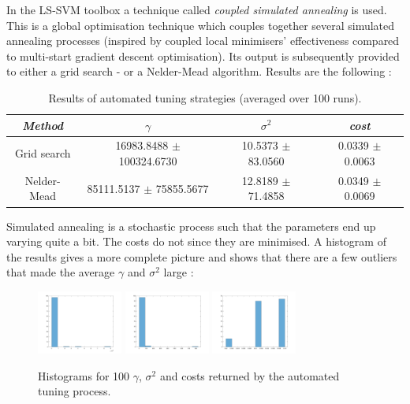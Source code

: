 \par In the LS-SVM toolbox a technique called \textit{coupled simulated annealing} is used. This is a global optimisation technique which couples together several simulated annealing processes (inspired by coupled local minimisers' effectiveness compared to multi-start gradient descent optimisation). Its output is subsequently provided to either a grid search - or a Nelder-Mead algorithm. Results are the following :

\begin{table}[h]
\centering
\begin{tabular}{c|ccc}
\textit{Method} & $\gamma$ & $\sigma^2$ & \textit{cost} \\
\hline
Grid search & 16983.8488 $\pm$ 100324.6730 & 10.5373 $\pm$ 83.0560 & 0.0339 $\pm$ 0.0063\\
Nelder-Mead & 85111.5137 $\pm$ 75855.5677 & 12.8189 $\pm$ 71.4858 & 0.0349 $\pm$ 0.0069\\
\end{tabular}
\caption{Results of automated tuning strategies (averaged over 100 runs).}
\label{automatedtuning}
\end{table}

Simulated annealing is a stochastic process such that the parameters end up varying quite a bit. The costs do not since they are minimised. A histogram of the results gives a more complete picture and shows that there are a few outliers that made the average $\gamma$ and $\sigma^2$ large :

\begin{figure}[h]
\centering
\includegraphics[width=0.25\textwidth]{../src/figures/iris/histogram_gamma}\quad
\includegraphics[width=0.25\textwidth]{../src/figures/iris/histogram_sigma2}\quad
\includegraphics[width=0.25\textwidth]{../src/figures/iris/histogram_cost}
\caption{Histograms for 100 $\gamma$, $\sigma^2$ and costs returned by the automated tuning process.}
\label{automatedtuninghistogram}
\end{figure}

